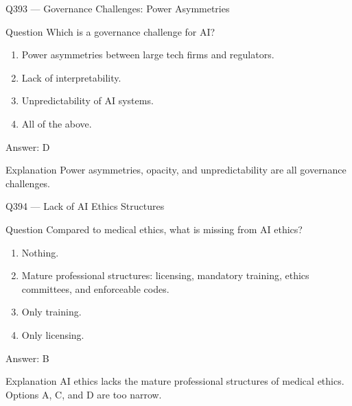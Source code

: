 \documentclass[aspectratio=169,8pt]{beamer}
\begin{document}
	\begin{frame}{Q393 --- Governance Challenges: Power Asymmetries}
		\begin{block}{Question}
			Which is a governance challenge for AI?
			\begin{enumerate}
				\item Power asymmetries between large tech firms and regulators.
				\item Lack of interpretability.
				\item Unpredictability of AI systems.
				\item All of the above.
			\end{enumerate}
		\end{block}
		\begin{exampleblock}{Answer: D}\end{exampleblock}
		\begin{block}{Explanation}
			Power asymmetries, opacity, and unpredictability are all governance challenges.
		\end{block}
	\end{frame}
	
	\begin{frame}{Q394 --- Lack of AI Ethics Structures}
		\begin{block}{Question}
			Compared to medical ethics, what is missing from AI ethics?
			\begin{enumerate}
				\item Nothing.
				\item Mature professional structures: licensing, mandatory training, ethics committees, and enforceable codes.
				\item Only training.
				\item Only licensing.
			\end{enumerate}
		\end{block}
		\begin{exampleblock}{Answer: B}\end{exampleblock}
		\begin{block}{Explanation}
			AI ethics lacks the mature professional structures of medical ethics. Options A, C, and D are too narrow.
		\end{block}
	\end{frame}
	
\end{document}
